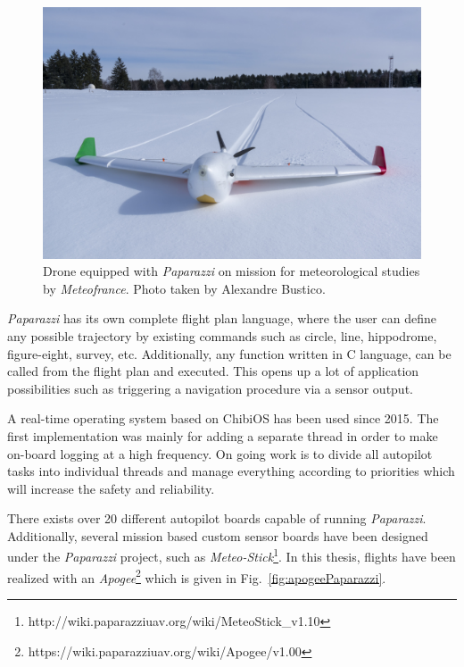 \begin{figure}
\begin{center}
\includegraphics[width=13cm]{figures/snowWhiteJPG}
\caption{Drone equipped with \emph{Paparazzi} on mission for meteorological studies by \emph{Meteofrance}. Photo taken by Alexandre Bustico.} 
\label{fig:snowWhite}
\end{center}
\end{figure}


\emph{Paparazzi} has its own complete flight plan language, where the user can define any possible trajectory by existing commands such as circle, line, hippodrome, figure-eight, survey, etc. 
Additionally, any function written in C language, can be called from the flight plan and executed. 
This opens up a lot of application possibilities such as triggering a navigation procedure via a sensor output.

A real-time operating system based on ChibiOS has been used since 2015. 
The first implementation was mainly for adding a separate thread in order to make on-board logging at a high frequency. 
On going work is to divide all autopilot tasks into individual threads and manage everything according to priorities which will increase the safety and reliability.

There exists over 20 different autopilot boards capable of running \emph{Paparazzi}. Additionally, several mission based custom sensor boards have been designed under the \emph{Paparazzi} project, such as \emph{Meteo-Stick}\footnote{http://wiki.paparazziuav.org/wiki/MeteoStick\_v1.10}. 
In this thesis, flights have been realized with an \emph{Apogee}\footnote{https://wiki.paparazziuav.org/wiki/Apogee/v1.00} which is given in Fig.~\ref{fig:apogeePaparazzi}.

